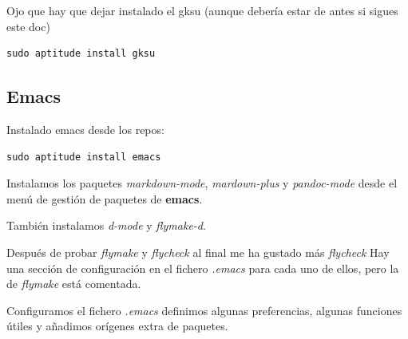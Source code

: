 \documentclass[12pt,spanish,]{article}
\begin{document}
Ojo que hay que dejar instalado el gksu (aunque debería estar de antes
si sigues este doc)

\begin{verbatim}
sudo aptitude install gksu
\end{verbatim}

\subsection{Emacs}\label{emacs}

Instalado emacs desde los repos:

\begin{verbatim}
sudo aptitude install emacs
\end{verbatim}

Instalamos los paquetes \emph{markdown-mode}, \emph{mardown-plus} y
\emph{pandoc-mode} desde el menú de gestión de paquetes de
\textbf{emacs}.

También instalamos \emph{d-mode} y \emph{flymake-d}.

Después de probar \emph{flymake} y \emph{flycheck} al final me ha
gustado más \emph{flycheck} Hay una sección de configuración en el
fichero \emph{.emacs} para cada uno de ellos, pero la de \emph{flymake}
está comentada.

Configuramos el fichero \emph{.emacs} definimos algunas preferencias,
algunas funciones útiles y añadimos orígenes extra de paquetes.
\end{document}
